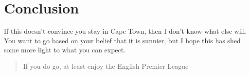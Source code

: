 \documentclass[11pt,preprint, authoryear]{elsarticle}
\numberwithin{equation}{section}
\numberwithin{figure}{section}
\numberwithin{table}{section}
\begin{document}
\hypertarget{conclusion}{%
\section{Conclusion}\label{conclusion}}

If this doesn't convince you stay in Cape Town, then I don't know what
else will. You want to go based on your belief that it is sunnier, but I
hope this has shed some more light to what you can expect.

\begin{quote}
If you do go, at least enjoy the English Premier League
\end{quote}


\end{document}
